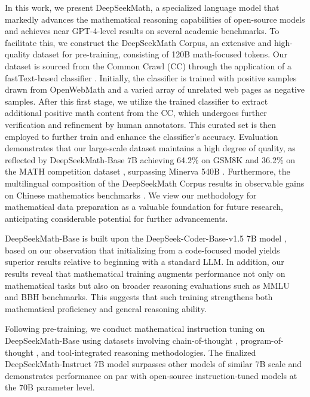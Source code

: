In this work, we present DeepSeekMath, a specialized language model that markedly advances the mathematical reasoning capabilities of open-source models and achieves near GPT-4-level results on several academic benchmarks. To facilitate this, we construct the DeepSeekMath Corpus, an extensive and high-quality dataset for pre-training, consisting of 120B math-focused tokens. Our dataset is sourced from the Common Crawl (CC) through the application of a fastText-based classifier \citep{joulin2016fasttext}. Initially, the classifier is trained with positive samples drawn from OpenWebMath \citep{openwebmath} and a varied array of unrelated web pages as negative samples. After this first stage, we utilize the trained classifier to extract additional positive math content from the CC, which undergoes further verification and refinement by human annotators. This curated set is then employed to further train and enhance the classifier's accuracy. Evaluation demonstrates that our large-scale dataset maintains a high degree of quality, as reflected by DeepSeekMath-Base 7B achieving 64.2\% on GSM8K \citep{gsm8k} and 36.2\% on the MATH competition dataset \citep{MATH}, surpassing Minerva 540B \citep{minerva}. Furthermore, the multilingual composition of the DeepSeekMath Corpus results in observable gains on Chinese mathematics benchmarks \citep{wei2023cmath,agieval}. We view our methodology for mathematical data preparation as a valuable foundation for future research, anticipating considerable potential for further advancements.

DeepSeekMath-Base is built upon the DeepSeek-Coder-Base-v1.5 7B model \citep{deepseek-coder}, based on our observation that initializing from a code-focused model yields superior results relative to beginning with a standard LLM. In addition, our results reveal that mathematical training augments performance not only on mathematical tasks but also on broader reasoning evaluations such as MMLU \citep{mmlu} and BBH \citep{bbh} benchmarks. This suggests that such training strengthens both mathematical proficiency and general reasoning ability.

Following pre-training, we conduct mathematical instruction tuning on DeepSeekMath-Base using datasets involving chain-of-thought \citep{cot}, program-of-thought \citep{pot,pal}, and tool-integrated reasoning \citep{tora} methodologies. The finalized DeepSeekMath-Instruct 7B model surpasses other models of similar 7B scale and demonstrates performance on par with open-source instruction-tuned models at the 70B parameter level.


